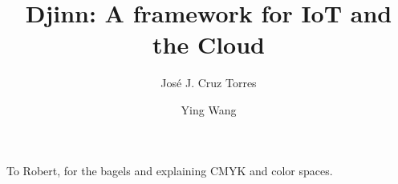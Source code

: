 \documentclass[sigconf]{acmart}
\begin{document}
\title{Djinn: A framework for IoT and the Cloud}


\author{José J. Cruz Torres}

\author{Ying Wang}

\renewcommand{\shortauthors}{Cruz and Wang, et al.}




\maketitle







\begin{acks}
To Robert, for the bagels and explaining CMYK and color spaces.
\end{acks}
\end{document}
